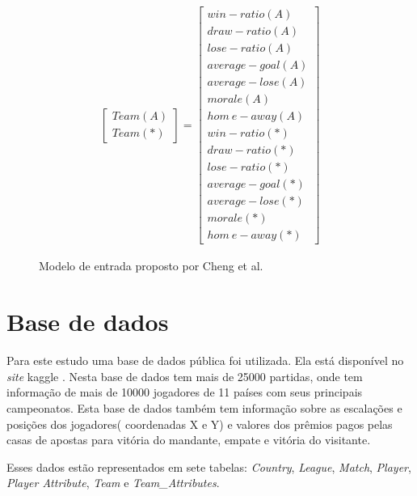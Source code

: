 \documentclass{article}
\begin{document}
\begin{figure}[!h] \centering
	
	$$
	\begin{array}{ccc}
	
	\left[ \begin{array}{c}
	Team (A) \\
	Team (*)
	\end{array} \right]
	
	=
	
	\left[ \begin{array}{c}
		 win - ratio (A)   \\
		 draw - ratio (A)  \\
		 lose - ratio (A)  \\
		average - goal (A) \\
		average - lose (A) \\
		    morale (A)     \\
		hom \ e - away (A) \\
		 win - ratio (*)   \\
		 draw - ratio (*)  \\
		 lose - ratio (*)  \\
		average - goal(*)  \\
		average - lose(*)  \\
		    morale (*)     \\
		hom \ e - away (*)
	\end{array} \right]
	
	\end{array} 
	$$
	
	\caption{Modelo de entrada proposto por Cheng et al. \cite{cheng2003new}}
	\label{fig:cheng_entradas}
\end{figure} 


\section{Base de dados}
Para este estudo uma base de dados pública foi utilizada. Ela está disponível no \textit{site} kaggle \cite{database}. Nesta base de dados tem mais de 25000 partidas, onde tem informação de mais de 10000 jogadores de 11 países com seus principais campeonatos. Esta base de dados também tem informação sobre as escalações e posições dos jogadores( coordenadas X e Y) e valores dos prêmios pagos pelas casas de apostas para vitória do mandante, empate e vitória do visitante.

Esses dados estão representados em sete tabelas: \textit{Country}, \textit{League}, \textit{Match}, \textit{Player}, \textit{Player Attribute}, \textit{Team} e \textit{Team\_Attributes}.
\end{document}
